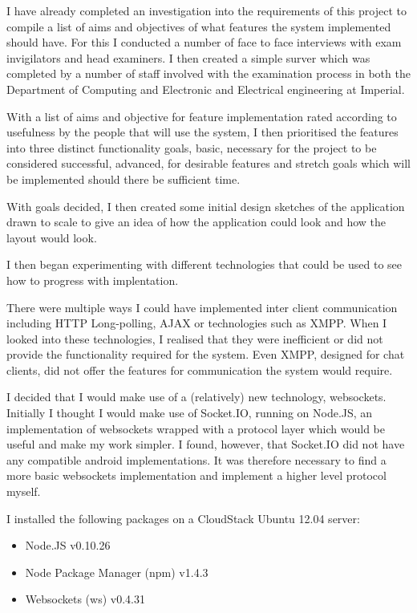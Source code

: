 \documentclass[idxtotoc,hyperref,openany]{labbook} %
\begin{document}
I have already completed an investigation into the requirements of this project to compile a list of aims and objectives of what features the system implemented should have.  For this I conducted a number of face to face interviews with exam invigilators and head examiners.  I then created a simple surver which was completed by a number of staff involved with the examination process in both the Department of Computing and Electronic and Electrical engineering at Imperial.

With a list of aims and objective for feature implementation rated according to usefulness by the people that will use the system, I then prioritised the features into three distinct functionality goals, basic, necessary for the project to be considered successful, advanced, for desirable features and stretch goals which will be implemented should there be sufficient time.

With goals decided, I then created some initial design sketches of the application drawn to scale to give an idea of how the application could look and how the layout would look.

I then began experimenting with different technologies that could be used to see how to progress with implentation.


There were multiple ways I could have implemented inter client communication including HTTP Long-polling, AJAX or technologies such as XMPP.  When I looked into these technologies, I realised that they were inefficient or did not provide the functionality required for the system.  Even XMPP, designed for chat clients, did not offer the features for communication the system would require.

I decided that I would make use of a (relatively) new technology, websockets.  Initially I thought I would make use of Socket.IO, running on Node.JS, an implementation of websockets wrapped with a protocol layer which would be useful and make my work simpler.  I found, however, that Socket.IO did not have any compatible android implementations.  It was therefore necessary to find a more basic websockets implementation and implement a higher level protocol myself.

I installed the following packages on a CloudStack Ubuntu 12.04 server:

\begin{itemize}
\item Node.JS v0.10.26
\item Node Package Manager (npm) v1.4.3
\item Websockets (ws) v0.4.31
\end{itemize}
\end{document}
